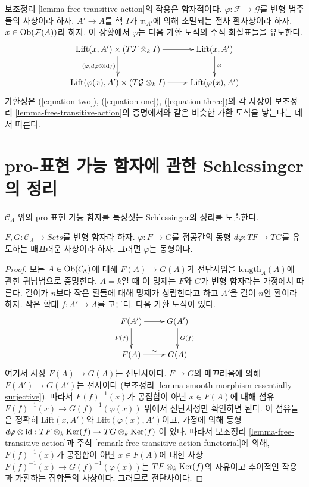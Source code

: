 \begin{remark}
\label{remark-free-transitive-action-functorial}
보조정리 \ref{lemma-free-transitive-action}의 작용은 함자적이다.
$\varphi : \mathcal{F} \to \mathcal{G}$를 변형 범주들의 사상이라 하자.
$A' \to A$를 핵 $I$가 $\mathfrak m_{A'}$에 의해 소멸되는
전사 환사상이라 하자. $x \in \mathop{\mathrm{Ob}}\nolimits(\mathcal{F}(A))$라 하자.
이 상황에서 $\varphi$는 다음 가환 도식의 수직 화살표들을 유도한다.
$$
\xymatrix{
\text{Lift}(x, A') \times (T\mathcal{F} \otimes_k I)
\ar[d]_{(\varphi, d\varphi \otimes \text{id}_I)} \ar[r] &
\text{Lift}(x, A') \ar[d]^\varphi \\
\text{Lift}(\varphi(x), A') \times (T\mathcal{G} \otimes_k I) \ar[r] &
\text{Lift}(\varphi(x), A')
}
$$
가환성은 (\ref{equation-two}), (\ref{equation-one}),
(\ref{equation-three})의 각 사상이 보조정리
\ref{lemma-free-transitive-action}의 증명에서와 같은
비슷한 가환 도식을 낳는다는 데서 따른다.
\end{remark}

\section{pro-표현 가능 함자에 관한 Schlessinger의 정리}
\label{section-schlessingers-theorem}

\noindent
$\mathcal{C}_\Lambda$ 위의 pro-표현 가능 함자를 특징짓는
Schlessinger의 정리를 도출한다.

\begin{lemma}
\label{lemma-minimal-smooth-morphism-functors}
$F, G: \mathcal{C}_\Lambda \to \textit{Sets}$를 변형 함자라 하자.
$\varphi : F \to G$를 접공간의 동형
$d\varphi : TF \to TG$를 유도하는 매끄러운 사상이라 하자.
그러면 $\varphi$는 동형이다.
\end{lemma}

\begin{proof}
모든 $A \in \mathop{\mathrm{Ob}}\nolimits(\mathcal{C}_\Lambda)$에 대해
$F(A) \to G(A)$가 전단사임을 $\text{length}_A(A)$에 관한
귀납법으로 증명한다. $A = k$일 때 이 명제는 $F$와 $G$가
변형 함자라는 가정에서 따른다. 길이가 $n$보다 작은 환들에 대해
명제가 성립한다고 하고 $A'$을 길이 $n$인 환이라 하자.
작은 확대 $f : A' \to A$를 고른다. 다음 가환 도식이 있다.
$$
\xymatrix{
F(A') \ar[r] \ar[d]_{F(f)} & G(A') \ar[d]^{G(f)} \\
F(A) \ar[r]^{\sim} & G(A)
}
$$
여기서 사상 $F(A) \to G(A)$는 전단사이다. $F
\to G$의 매끄러움에 의해 $F(A') \to G(A')$는 전사이다
(보조정리 \ref{lemma-smooth-morphism-essentially-surjective}).
따라서 $F(f)^{-1}(x)$가 공집합이 아닌 $x \in F(A)$에 대해
섬유 $F(f)^{-1}(x) \to G(f)^{-1}(\varphi(x))$ 위에서
전단사성만 확인하면 된다. 이 섬유들은 정확히
$\text{Lift}(x, A')$와 $\text{Lift}(\varphi(x), A')$이고,
가정에 의해 동형
$d\varphi \otimes \text{id} :
TF \otimes_k \mathop{\mathrm{Ker}}(f)  \to TG \otimes_k \mathop{\mathrm{Ker}}(f)$
이 있다. 따라서 보조정리 \ref{lemma-free-transitive-action}과
주석 \ref{remark-free-transitive-action-functorial}에 의해,
$F(f)^{-1}(x)$가 공집합이 아닌 $x \in F(A)$에 대한 사상
$F(f)^{-1}(x) \to G(f)^{-1}(\varphi(x))$는
$TF \otimes_k \mathop{\mathrm{Ker}}(f)$의 자유이고 추이적인 작용과 가환하는
집합들의 사상이다. 그러므로 전단사이다.
\end{proof}


